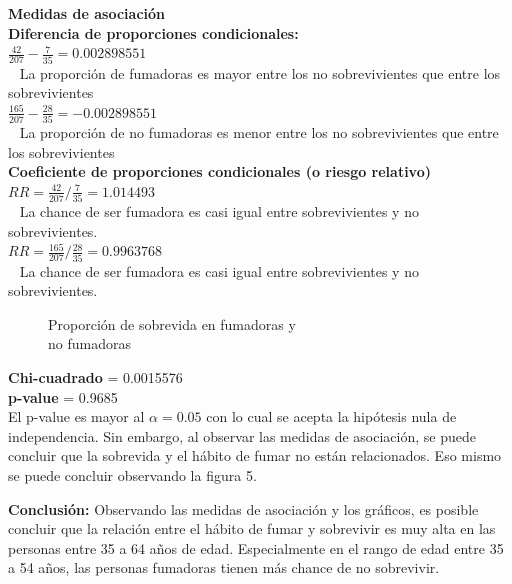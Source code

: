 \documentclass[12pt,letterpaper,fleqn]{article}
\begin{document}
\begin{enumerate}[label=\textbf{\arabic*.}]
\begin{enumerate}[label=\textbf{\alph*.}]
                \textbf{Medidas de asociación} \\
                \textbf{Diferencia de proporciones condicionales:} \\
                $ \frac{42}{207}-\frac{7}{35} = 0.002898551 $ \\ 
                La proporción de fumadoras es mayor entre los no sobrevivientes que entre los sobrevivientes \\
                $ \frac{165}{207}-\frac{28}{35} = -0.002898551 $ \\ 
                La proporción de no fumadoras es menor entre los no sobrevivientes que entre los sobrevivientes\\

                \textbf{Coeficiente de proporciones condicionales (o riesgo relativo)}\\
                 $ RR =  \frac{42}{207}/\frac{7}{35} = 1.014493 $ \\ 
                 La chance de ser fumadora es casi igual entre sobrevivientes y no sobrevivientes.\\
                 $ RR =  \frac{165}{207}/\frac{28}{35} = 0.9963768 $ \\ 
                 La chance de ser fumadora es casi igual entre sobrevivientes y no sobrevivientes.\\

                \begin{figure}[!htb]
                    \centering
                    
                    \caption{Proporción de sobrevida en fumadoras y \\no fumadoras}
                    \label{fig:figure5}
                \end{figure}
                \FloatBarrier
                \textbf{Chi-cuadrado} = 0.0015576 \\
                \textbf{p-value} = 0.9685 \\
                El p-value es mayor al $ \alpha = 0.05 $ con lo cual se acepta la hipótesis nula de independencia. Sin embargo, al observar las medidas de asociación, se puede concluir que la sobrevida y el hábito de fumar no están relacionados. Eso mismo se puede concluir observando la figura 5. \\
            \end{enumerate}

            \textbf{Conclusión:}
            Observando las medidas de asociación y los gráficos, es posible concluir que la relación entre el hábito de fumar y sobrevivir es muy alta en las personas entre 35 a 64 años de edad. Especialmente en el rango de edad entre 35 a 54 años, las personas fumadoras tienen más chance de no sobrevivir.


\end{enumerate}
\end{document}

